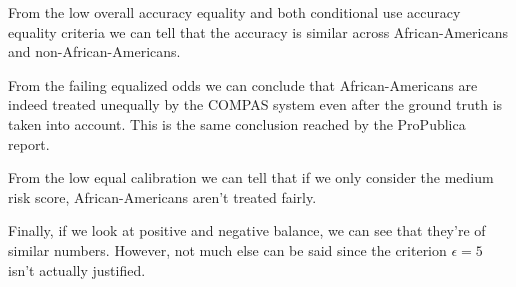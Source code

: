 \documentclass[conference]{IEEEtran}
\begin{document}
From the low overall accuracy equality and both conditional use accuracy equality criteria we can tell that the accuracy is similar across African-Americans and non-African-Americans.

From the failing equalized odds we can conclude that African-Americans are indeed treated unequally by the COMPAS system even after the ground truth is taken into account. This is the same conclusion reached by the ProPublica report.

From the low equal calibration we can tell that if we only consider the medium risk score, African-Americans aren't treated fairly.

Finally, if we look at positive and negative balance, we can see that they're of similar numbers. However, not much else can be said since the criterion $\epsilon = 5$ isn't actually justified.







\end{document}
